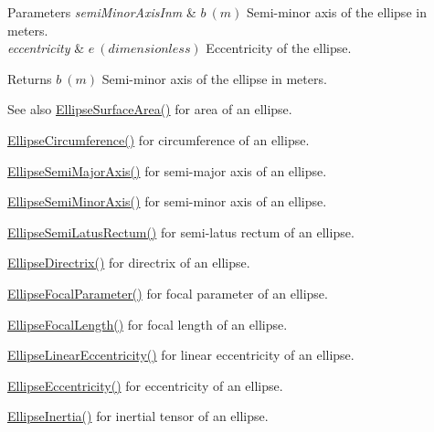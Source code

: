\begin{DoxyParams}{Parameters}
{\em semi\+Minor\+Axis\+Inm} & $ b\ (m)$ Semi-\/minor axis of the ellipse in meters. \\
\hline
{\em eccentricity} & $ e\ (dimensionless)$ Eccentricity of the ellipse. \\
\hline
\end{DoxyParams}
\begin{DoxyReturn}{Returns}
$ b\ (m)$ Semi-\/minor axis of the ellipse in meters. 
\end{DoxyReturn}
\begin{DoxySeeAlso}{See also}
\mbox{\hyperlink{group___e_g_x_math-_geometry-2_d-_ellipse-_surface_area_ga4ce8c8323e9718ce5458f4ab7f6d823d}{Ellipse\+Surface\+Area()}} for area of an ellipse. 

\mbox{\hyperlink{group___e_g_x_math-_geometry-2_d-_ellipse-_circumference_ga4172802ac674eb53467b44928ac635c7}{Ellipse\+Circumference()}} for circumference of an ellipse. 

\mbox{\hyperlink{group___e_g_x_math-_geometry-2_d-_ellipse-_semi_major_axis_ga646a2ca065f4ac3f666a9ea22f3bb527}{Ellipse\+Semi\+Major\+Axis()}} for semi-\/major axis of an ellipse. 

\mbox{\hyperlink{group___e_g_x_math-_geometry-2_d-_ellipse-_semi_minor_axis_gae461acf3333565d69527dd86e9aa2b32}{Ellipse\+Semi\+Minor\+Axis()}} for semi-\/minor axis of an ellipse. 

\mbox{\hyperlink{group___e_g_x_math-_geometry-2_d-_ellipse-_semi_latus_rectum_gacfd1844eb4ef3d1ee3c0b460a6442ae6}{Ellipse\+Semi\+Latus\+Rectum()}} for semi-\/latus rectum of an ellipse. 

\mbox{\hyperlink{group___e_g_x_math-_geometry-2_d-_ellipse-_directrix_gace8f72a8efbc9c18d3eb689151405106}{Ellipse\+Directrix()}} for directrix of an ellipse. 

\mbox{\hyperlink{group___e_g_x_math-_geometry-2_d-_ellipse-_focal_parameter_ga4cd01a38c72c092ef9791351948bf69b}{Ellipse\+Focal\+Parameter()}} for focal parameter of an ellipse. 

\mbox{\hyperlink{group___e_g_x_math-_geometry-2_d-_ellipse-_focal_length_gab8d63de7640c880cfecaeada6f2afdac}{Ellipse\+Focal\+Length()}} for focal length of an ellipse. 

\mbox{\hyperlink{group___e_g_x_math-_geometry-2_d-_ellipse-_linear_eccentricity_gac70b3010e30aa8b73deb50fe2b9b9a91}{Ellipse\+Linear\+Eccentricity()}} for linear eccentricity of an ellipse. 

\mbox{\hyperlink{group___e_g_x_math-_geometry-2_d-_ellipse-_eccentricity_ga6a0a7fba17f782616894cfc447628c33}{Ellipse\+Eccentricity()}} for eccentricity of an ellipse. 

\mbox{\hyperlink{group___e_g_x_math-_geometry-2_d-_ellipse-_inertia_ga10a3049c2f04b50f271fb01dc62e4cf8}{Ellipse\+Inertia()}} for inertial tensor of an ellipse. 
\end{DoxySeeAlso}

